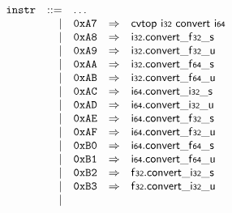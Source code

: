 $$
\begin{array}{@{}l@{}rrlll@{}l@{}}
& {\mathtt{instr}} &::=& \dots \\ &&|&
\mathtt{0xA7} &\Rightarrow& \mathsf{cvtop}~\mathsf{i{\scriptstyle32}}~\mathsf{convert}~\mathsf{i{\scriptstyle64}} \\ &&|&
\mathtt{0xA8} &\Rightarrow& \mathsf{i{\scriptstyle32}} . {{{{\mathsf{convert}}{\mathsf{\_}}}{\mathsf{f{\scriptstyle32}}}}{\mathsf{\_}}}{\mathsf{s}} \\ &&|&
\mathtt{0xA9} &\Rightarrow& \mathsf{i{\scriptstyle32}} . {{{{\mathsf{convert}}{\mathsf{\_}}}{\mathsf{f{\scriptstyle32}}}}{\mathsf{\_}}}{\mathsf{u}} \\ &&|&
\mathtt{0xAA} &\Rightarrow& \mathsf{i{\scriptstyle32}} . {{{{\mathsf{convert}}{\mathsf{\_}}}{\mathsf{f{\scriptstyle64}}}}{\mathsf{\_}}}{\mathsf{s}} \\ &&|&
\mathtt{0xAB} &\Rightarrow& \mathsf{i{\scriptstyle32}} . {{{{\mathsf{convert}}{\mathsf{\_}}}{\mathsf{f{\scriptstyle64}}}}{\mathsf{\_}}}{\mathsf{u}} \\ &&|&
\mathtt{0xAC} &\Rightarrow& \mathsf{i{\scriptstyle64}} . {{{{\mathsf{convert}}{\mathsf{\_}}}{\mathsf{i{\scriptstyle32}}}}{\mathsf{\_}}}{\mathsf{s}} \\ &&|&
\mathtt{0xAD} &\Rightarrow& \mathsf{i{\scriptstyle64}} . {{{{\mathsf{convert}}{\mathsf{\_}}}{\mathsf{i{\scriptstyle32}}}}{\mathsf{\_}}}{\mathsf{u}} \\ &&|&
\mathtt{0xAE} &\Rightarrow& \mathsf{i{\scriptstyle64}} . {{{{\mathsf{convert}}{\mathsf{\_}}}{\mathsf{f{\scriptstyle32}}}}{\mathsf{\_}}}{\mathsf{s}} \\ &&|&
\mathtt{0xAF} &\Rightarrow& \mathsf{i{\scriptstyle64}} . {{{{\mathsf{convert}}{\mathsf{\_}}}{\mathsf{f{\scriptstyle32}}}}{\mathsf{\_}}}{\mathsf{u}} \\ &&|&
\mathtt{0xB0} &\Rightarrow& \mathsf{i{\scriptstyle64}} . {{{{\mathsf{convert}}{\mathsf{\_}}}{\mathsf{f{\scriptstyle64}}}}{\mathsf{\_}}}{\mathsf{s}} \\ &&|&
\mathtt{0xB1} &\Rightarrow& \mathsf{i{\scriptstyle64}} . {{{{\mathsf{convert}}{\mathsf{\_}}}{\mathsf{f{\scriptstyle64}}}}{\mathsf{\_}}}{\mathsf{u}} \\ &&|&
\mathtt{0xB2} &\Rightarrow& \mathsf{f{\scriptstyle32}} . {{{{\mathsf{convert}}{\mathsf{\_}}}{\mathsf{i{\scriptstyle32}}}}{\mathsf{\_}}}{\mathsf{s}} \\ &&|&
\mathtt{0xB3} &\Rightarrow& \mathsf{f{\scriptstyle32}} . {{{{\mathsf{convert}}{\mathsf{\_}}}{\mathsf{i{\scriptstyle32}}}}{\mathsf{\_}}}{\mathsf{u}} \\ &&|&

\end{array}$$
